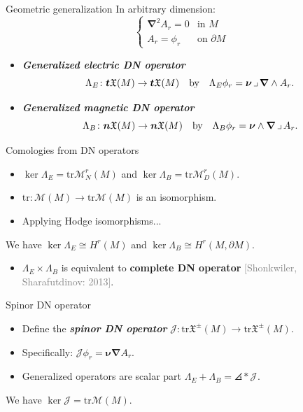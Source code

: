 \documentclass[aspectratio=169,handout]{beamer}
\newcommand\boldgreen[1]{\textcolor{lighter_csu_green}{\emph{\textbf{#1}}}}
\newcommand\boldgold[1]{\textcolor{csu_gold}{\textbf{#1}}}
\newcommand\grey[1]{\textcolor{gray}{#1}}
\newcommand{\trace}{\mathrm{tr}}
\newcommand{\tangentpart}{\boldsymbol{t}}
\newcommand{\normalpart}{\boldsymbol{n}}
\newcommand{\grad}{\boldsymbol{\nabla}}
\newcommand{\monogenics}{\mathcal{M}}
\newcommand{\blade}[1]{\boldsymbol{#1}}
\newcommand{\boundary}{{\partial M}}
\newcommand{\normal}{\blade{\nu}}
\newcommand{\contract}{\hspace*{.5mm} \lrcorner \hspace*{.5mm}}
\DeclarePairedDelimiter\angles{\langle}{\rangle}
\newcommand{\proj}[2]{\angles*{#2}_{#1}}
\newcommand{\smoothfields}{\mathfrak{X}}
\begin{document}
\begin{frame}{Geometric generalization}
\vfill
\pause
In arbitrary dimension:
\[
\begin{cases}
\grad^2 A_r = 0 & \textrm{in $M$}\\
A_r = \phi_r & \textrm{on $\partial M$}
\end{cases}
\]
\begin{itemize}
\pause
\item \boldgreen{Generalized electric DN operator}
\[
\Lambda_E \colon \tangentpart \smoothfields(M) \to \tangentpart \smoothfields(M) \quad \textrm{by} \quad \Lambda_E \phi_r = \normal \contract \grad \wedge A_r.
\]
\pause
\item \boldgreen{Generalized magnetic DN operator}
\[
\Lambda_B \colon \normalpart \smoothfields(M) \to \normalpart \smoothfields(M) \quad \textrm{by} \quad \Lambda_B \phi_r = \normal \wedge \grad \contract A_r.
\]
\end{itemize}
\vfill
\end{frame}


\begin{frame}{Comologies from DN operators}
\vfill
\begin{itemize}
\pause
\item $\ker \Lambda_{E} = \trace \monogenics_N^r(M)$ and $\ker \Lambda_B =\trace \monogenics_D^r(M)$.
\pause
\item $\trace \colon \monogenics(M) \to \trace \monogenics(M)$ is an isomorphism.
\pause
\item Applying Hodge isomorphisms...
\end{itemize}
\begin{thm*}{}{}
We have $\ker \Lambda_E \cong H^r(M)$ and $\ker \Lambda_B \cong H^r(M,\boundary)$.
\end{thm*}
\begin{itemize}
  \item $\Lambda_E \times \Lambda_B$ is equivalent to \boldgold{complete DN operator} \grey{[Shonkwiler, Sharafutdinov: 2013]}.
\end{itemize}
\vfill
\end{frame}

\begin{frame}{Spinor DN operator}
\vfill
\begin{itemize}
\pause
\item Define the \boldgreen{spinor DN operator} $\mathcal{J}\colon \trace \smoothfields^\pm(M) \to \trace \smoothfields^\pm(M)$.
\pause
\item Specifically: $\mathcal{J}\phi_r = \normal \grad A_r$.
\pause
\item Generalized operators are scalar part $\Lambda_E+\Lambda_B = \proj{}{\mathcal{J}}$.
\end{itemize}
\pause
\begin{thm*}{}{}
We have $\ker \mathcal{J} = \trace \monogenics(M)$.
\end{thm*}
\vfill
\end{frame}
\end{document}
